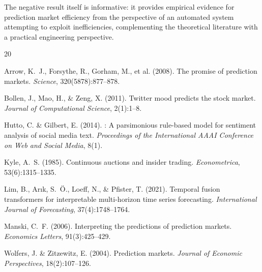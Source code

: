 \documentclass[12pt, letterpaper]{article}
\begin{document}
The negative result itself is informative: it provides empirical evidence for prediction market efficiency from the perspective of an automated system attempting to exploit inefficiencies, complementing the theoretical literature with a practical engineering perspective.


\begin{thebibliography}{20}

Arrow, K.~J., Forsythe, R., Gorham, M., et al. (2008).
\newblock The promise of prediction markets.
\newblock \textit{Science}, 320(5878):877--878.

Bollen, J., Mao, H., \& Zeng, X. (2011).
\newblock Twitter mood predicts the stock market.
\newblock \textit{Journal of Computational Science}, 2(1):1--8.

Hutto, C. \& Gilbert, E. (2014).
: A parsimonious rule-based model for sentiment analysis of social media text.
\newblock \textit{Proceedings of the International AAAI Conference on Web and Social Media}, 8(1).

Kyle, A.~S. (1985).
\newblock Continuous auctions and insider trading.
\newblock \textit{Econometrica}, 53(6):1315--1335.

Lim, B., Ar{\i}k, S.~{\"O}., Loeff, N., \& Pfister, T. (2021).
\newblock Temporal fusion transformers for interpretable multi-horizon time series forecasting.
\newblock \textit{International Journal of Forecasting}, 37(4):1748--1764.

Manski, C.~F. (2006).
\newblock Interpreting the predictions of prediction markets.
\newblock \textit{Economics Letters}, 91(3):425--429.

Wolfers, J. \& Zitzewitz, E. (2004).
\newblock Prediction markets.
\newblock \textit{Journal of Economic Perspectives}, 18(2):107--126.

\end{thebibliography}
\end{document}

